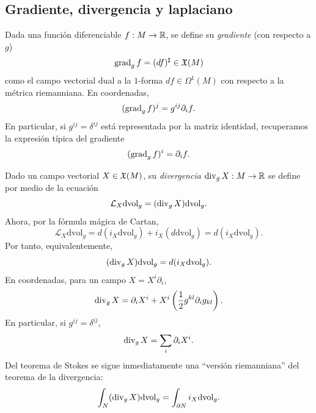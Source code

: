 \documentclass[11pt,a4paper]{amsbook}
\theoremstyle{remark} \newtheorem{rmk}[subsection]{Observación}
\theoremstyle{definition} \newtheorem{defn}[subsection]{Definición}
\theoremstyle{definition} \newtheorem{ex}[subsection]{Ejemplo}
\theoremstyle{definition} \newtheorem{ej}[subsection]{Ejercicio}
\begin{document}
\subsection{Gradiente, divergencia y laplaciano} Dada una función diferenciable $f:M\rightarrow \mathbb R$, se define su \emph{gradiente} (con respecto a $g$)
\begin{equation*}
\operatorname{grad}_g f = (df)^\sharp \in \mathfrak X(M)
\end{equation*}
como el campo vectorial dual a la $1$-forma $df\in \Omega^1(M)$ con respecto a la métrica riemanniana. En coordenadas,
\begin{equation*}
(\operatorname{grad}_g f)^j = g^{ij} \partial_if.
\end{equation*}
En particular, si $g^{ij}=\delta^{ij}$ está representada por la matriz identidad, recuperamos la expresión típica del gradiente
\begin{equation*}
(\operatorname{grad}_g f)^i = \partial_if .
\end{equation*}


Dado un campo vectorial $X\in \mathfrak X(M)$, su \emph{divergencia} $\operatorname{div}_g X: M\rightarrow \mathbb R$ se define por medio de la ecuación
\begin{equation*}
\mathcal{L}_X \mathrm{dvol}_g = (\operatorname{div}_g X) \mathrm{dvol}_g.
\end{equation*}
Ahora, por la fórmula mágica de Cartan,
\begin{equation*}
\mathcal{L}_X \mathrm{dvol}_g = d(i_X\mathrm{dvol}_g) + i_X(d\mathrm{dvol}_g) = d(i_X\mathrm{dvol}_g).
\end{equation*}
Por tanto, equivalentemente,
\begin{equation*}
(\operatorname{div}_g X) \mathrm{dvol}_g=d(i_X\mathrm{dvol}_g).
\end{equation*}
En coordenadas, para un campo $X=X^i \partial_i$,
\begin{equation*}
\operatorname{div}_g X = \partial_i X^i + X^i \left( \frac{1}{2} g^{kl} \partial_{i}g_{kl} \right).
\end{equation*}
En particular, si $g^{ij}=\delta^{ij}$,
\begin{equation*}
\operatorname{div}_g X = \sum_{i} \partial_i X^i.
\end{equation*}
Del teorema de Stokes se sigue inmediatamente una ``versión riemanniana'' del teorema de la divergencia:
\begin{equation*}
\int_{N} (\operatorname{div}_g X) \mathrm{dvol}_g = \int_{\partial N} i_X \mathrm{dvol}_g.
\end{equation*}
\end{document}
